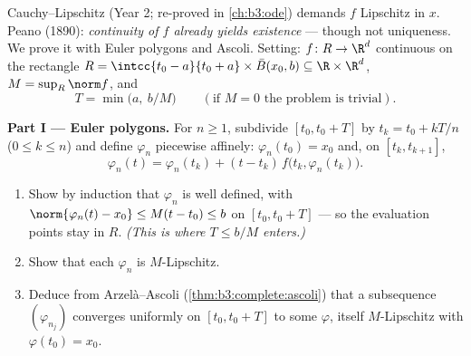 \begin{problem}[{Weekend problem --- existence of solutions of
$x' = f(t, x)$ without Lipschitz}]\label{pb:b3:complete:1}
Cauchy--Lipschitz (Year 2; re-proved in \cref{ch:b3:ode})
demands $f$ Lipschitz in $x$. Peano (1890): \emph{continuity of
$f$ already yields existence} --- though not uniqueness. We
prove it with Euler polygons and Ascoli. Setting: $f \colon R
\to \R^d$ continuous on the rectangle $R = \intcc{t_0 - a}{t_0
+ a}\times \bar B(x_0, b) \subseteq \R\times\R^d$, $M =
\sup_R\norm f$, and
\[
T = \min\bigl(a,\ b/M\bigr)
\qquad (\text{if } M = 0 \text{ the problem is trivial}).
\]

\medskip
\noindent\textbf{Part I --- Euler polygons.} For $n \geq 1$,
subdivide $[t_0, t_0 + T]$ by $t_k = t_0 + kT/n$ ($0 \leq k
\leq n$) and define $\varphi_n$ piecewise affinely:
$\varphi_n(t_0) = x_0$ and, on $[t_k, t_{k+1}]$,
\[
\varphi_n(t) = \varphi_n(t_k) + (t -
t_k)\,f\bigl(t_k, \varphi_n(t_k)\bigr).
\]
\begin{enumerate}
  \item Show by induction that $\varphi_n$ is well defined,
        with $\norm{\varphi_n(t) - x_0} \leq M(t - t_0) \leq b$
        on $[t_0, t_0 + T]$ --- so the evaluation points stay
        in $R$. \emph{(This is where $T \leq b/M$ enters.)}
  \item Show that each $\varphi_n$ is $M$-Lipschitz.
  \item Deduce from Arzel\`a--Ascoli
        (\cref{thm:b3:complete:ascoli}) that a subsequence
        $(\varphi_{n_j})$ converges uniformly on $[t_0, t_0 +
        T]$ to some $\varphi$, itself $M$-Lipschitz with
        $\varphi(t_0) = x_0$.
\end{enumerate}


\end{problem}
